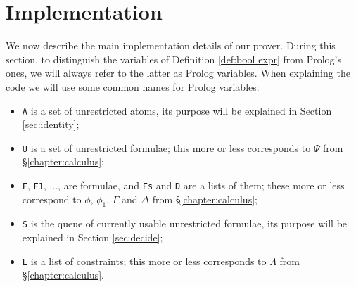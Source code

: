 \chapter{Implementation}\label{chapter:implementation}
We now describe the main implementation details of our prover.
During this section, to distinguish the variables of Definition \ref{def:bool expr} from Prolog's ones, we will always refer to the latter as Prolog variables.
When explaining the code we will use some common names for Prolog variables:
\begin{itemize}
	\item \texttt{A} is a set of unrestricted atoms, its purpose will be explained in Section \ref{sec:identity};
	\item \texttt{U} is a set of unrestricted formulae; this more or less corresponds to $\Psi$ from \S\ref{chapter:calculus};
	\item \texttt{F}, \texttt{F1}, ..., are formulae, and \texttt{Fs} and \texttt{D} are a lists of them; these more or less correspond to $\phi$, $\phi_1$, $\Gamma$ and $\Delta$ from \S\ref{chapter:calculus};
	\item \texttt{S} is the queue of currently usable unrestricted formulae, its purpose will be explained in Section \ref{sec:decide};
	\item \texttt{L} is a list of constraints; this more or less corresponds to $\Lambda$ from \S\ref{chapter:calculus}.
\end{itemize}

